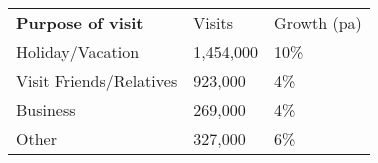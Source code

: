 \begin{tabular}[t]{p{4.7cm}>{\hfill}p{1.1cm}>{\hfill}p{1.7cm}}
 \textbf{Purpose of visit} & Visits & Growth (pa) \\ 
 Holiday/Vacation & 1,454,000 & 10\% \\ 
  Visit Friends/Relatives &   923,000 & 4\% \\ 
  Business &   269,000 & 4\% \\ 
  Other & 327,000 & 6\% \\ 
  \end{tabular}
